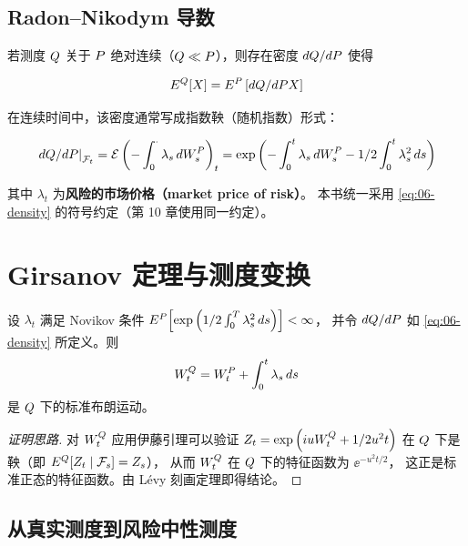 \subsection{Radon--Nikodym 导数}

若测度 $Q$ 关于 $P$ 绝对连续（$Q\ll P$），则存在密度 $dQ/dP$ 使得

\begin{equation}
  E^{Q}[X] = E^{P}\left[dQ/dP X\right]
  \label{eq:06-rn}
\end{equation}

在连续时间中，该密度通常写成指数鞅（随机指数）形式：

\begin{equation}
  \left.dQ/dP\right|_{\mathcal{F}_t}
  = \mathcal{E}\left(-\int_0^{\cdot}\lambda_s\,d W_s^{P}\right)_t
  = \exp\left(-\int_0^{t}\lambda_s\,d W_s^{P}-1/2\int_0^{t}\lambda_s^2\,d s\right)
  \label{eq:06-density}
\end{equation}

其中 $\lambda_t$ 为\textbf{风险的市场价格（market price of risk）}。
本书统一采用 \cref{eq:06-density} 的符号约定（第 10 章使用同一约定）。

\section{Girsanov 定理与测度变换}

\begin{theorem}[Girsanov]\label{thm:06-girsanov}
设 $\lambda_t$ 满足 Novikov 条件
$E^{P}\!\left[\exp\left(1/2\int_0^T\lambda_s^2\,d s\right)\right]<\infty$，
并令 $dQ/dP$ 如 \cref{eq:06-density} 所定义。则
\begin{equation}
  W_t^{Q} = W_t^{P} + \int_0^{t}\lambda_s\,d s
  \label{eq:06-girsanov-w}
\end{equation}
是 $Q$ 下的标准布朗运动。
\end{theorem}

\begin{proof}[证明思路]
对 $W_t^{Q}$ 应用伊藤引理可以验证 $Z_t = \exp\left(i u W_t^{Q}+1/2u^2t\right)$
在 $Q$ 下是鞅（即 $E^{Q}[Z_t\mid\mathcal{F}_s]=Z_s$），
从而 $W_t^{Q}$ 在 $Q$ 下的特征函数为 $\ee^{-u^2t/2}$，
这正是标准正态的特征函数。由 Lévy 刻画定理即得结论。
\end{proof}

\subsection{从真实测度到风险中性测度}

